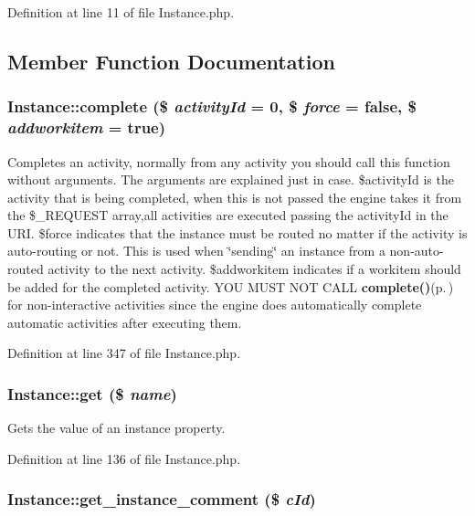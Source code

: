 Definition at line 11 of file Instance.php.

\subsection{Member Function Documentation}
\subsubsection{\setlength{\rightskip}{0pt plus 5cm}Instance::complete (\$ {\em activity\-Id} = 0, \$ {\em force} = false, \$ {\em addworkitem} = true)}\label{classInstance_a23}


Completes an activity, normally from any activity you should call this function without arguments. The arguments are explained just in case. \$activity\-Id is the activity that is being completed, when this is not passed the engine takes it from the \$\_\-REQUEST array,all activities are executed passing the activity\-Id in the URI. \$force indicates that the instance must be routed no matter if the activity is auto-routing or not. This is used when \char`\"{}sending\char`\"{} an instance from a non-auto-routed activity to the next activity. \$addworkitem indicates if a workitem should be added for the completed activity. YOU MUST NOT CALL {\bf complete()}{\rm (p.\,\pageref{classInstance_a23})} for non-interactive activities since the engine does automatically complete automatic activities after executing them. 

Definition at line 347 of file Instance.php.
\subsubsection{\setlength{\rightskip}{0pt plus 5cm}Instance::get (\$ {\em name})}\label{classInstance_a5}


Gets the value of an instance property. 

Definition at line 136 of file Instance.php.
\subsubsection{\setlength{\rightskip}{0pt plus 5cm}Instance::get\_\-instance\_\-comment (\$ {\em c\-Id})}\label{classInstance_a26}


